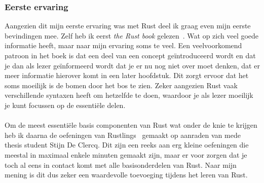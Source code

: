 \subsubsection{Eerste ervaring}
Aangezien dit mijn eerste ervaring was met Rust deel ik graag even mijn eerste bevindingen mee.
Zelf heb ik eerst \textit{the Rust book} gelezen~\cite{the_rust_book}.
Wat op zich veel goede informatie heeft, maar naar mijn ervaring soms te veel.
Een veelvoorkomend patroon in het boek is dat een deel van een concept geïntroduceerd wordt en dat je dan als lezer geïnformeerd wordt dat je er nu nog niet over moet denken, dat er meer informatie hierover komt in een later hoofdstuk.
Dit zorgt ervoor dat het soms moeilijk is de bomen door het bos te zien.
Zeker aangezien Rust vaak verschillende syntaxen heeft om hetzelfde te doen, waardoor je als lezer moeilijk je kunt focussen op de essentiële delen.
\\ \\
Om de meest essentiële basis componenten van Rust wat onder de knie te krijgen heb ik daarna de oefeningen van Rustlings~\cite{rustlings} gemaakt op aanraden van mede thesis student Stijn De Clercq.
Dit zijn een reeks aan erg kleine oefeningen die meestal in maximaal enkele minuten gemaakt zijn, maar er voor zorgen dat je toch al eens in contact komt met alle basisonderdelen van Rust.
Naar mijn mening is dit dus zeker een waardevolle toevoeging tijdens het leren van Rust.

